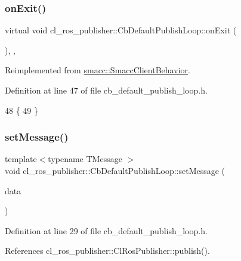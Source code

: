 \subsubsection{\texorpdfstring{on\+Exit()}{onExit()}}
{\footnotesize\ttfamily virtual void cl\+\_\+ros\+\_\+publisher\+::\+Cb\+Default\+Publish\+Loop\+::on\+Exit (\begin{DoxyParamCaption}{ }\end{DoxyParamCaption})\hspace{0.3cm}{\ttfamily [inline]}, {\ttfamily [override]}, {\ttfamily [virtual]}}



Reimplemented from \hyperlink{classsmacc_1_1SmaccClientBehavior_a7e4fb6ce81ff96dc172425852d69c0c5}{smacc\+::\+Smacc\+Client\+Behavior}.



Definition at line 47 of file cb\+\_\+default\+\_\+publish\+\_\+loop.\+h.


\begin{DoxyCode}
48     \{
49     \}
\end{DoxyCode}
\mbox{\label{classcl__ros__publisher_1_1CbDefaultPublishLoop_a0377d84fde4cd1193abe5daf172359a7}} 
\subsubsection{\texorpdfstring{set\+Message()}{setMessage()}}
{\footnotesize\ttfamily template$<$typename T\+Message $>$ \\
void cl\+\_\+ros\+\_\+publisher\+::\+Cb\+Default\+Publish\+Loop\+::set\+Message (\begin{DoxyParamCaption}\item[{const T\+Message \&}]{data }\end{DoxyParamCaption})\hspace{0.3cm}{\ttfamily [inline]}}



Definition at line 29 of file cb\+\_\+default\+\_\+publish\+\_\+loop.\+h.



References cl\+\_\+ros\+\_\+publisher\+::\+Cl\+Ros\+Publisher\+::publish().



